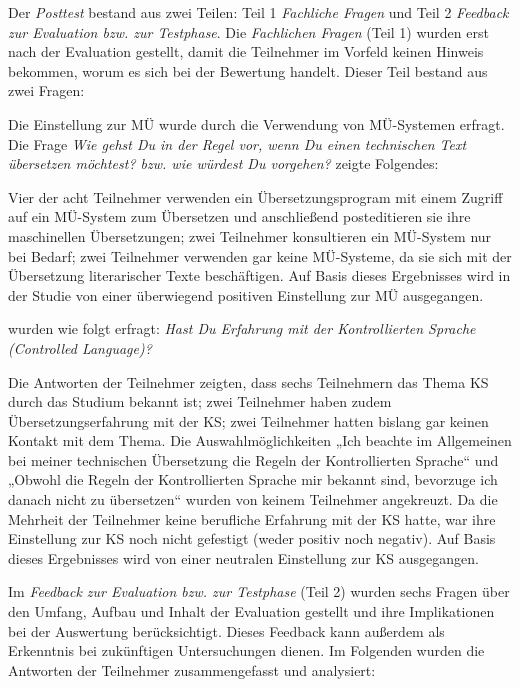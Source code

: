 Der \textit{Posttest} bestand aus zwei Teilen: Teil 1 \textit{Fachliche Fragen} und Teil 2 \textit{Feedback zur Evaluation bzw. zur Testphase}. Die \textit{Fachlichen Fragen} (Teil 1) wurden erst nach der Evaluation gestellt, damit die Teilnehmer im Vorfeld keinen Hinweis bekommen, worum es sich bei der Bewertung handelt. Dieser Teil bestand aus zwei Fragen:

\begin{description}[font = \normalfont\bfseries]
\item[1. Einstellung zur MÜ:] Die Einstellung zur MÜ wurde durch die Verwendung von MÜ-Systemen erfragt. Die Frage \textit{Wie gehst Du in der Regel vor, wenn Du einen technischen Text übersetzen möchtest? bzw. wie würdest Du vorgehen?} zeigte Folgendes:

Vier der acht Teilnehmer verwenden ein Übersetzungsprogram mit einem Zugriff auf ein MÜ-System zum Übersetzen und anschließend posteditieren sie ihre maschinellen Übersetzungen; zwei Teilnehmer konsultieren ein MÜ-System nur bei Bedarf; zwei Teilnehmer verwenden gar keine MÜ-Systeme, da sie sich mit der Übersetzung literarischer Texte beschäftigen. Auf Basis dieses Ergebnisses wird in der Studie von einer überwiegend positiven Einstellung zur MÜ ausgegangen.

\newpage
\largerpage[3]
\item[2. Kenntnisse bzw. Erfahrung mit der Kontrollierten Sprache] wurden wie folgt erfragt: \textit{Hast Du Erfahrung mit der Kontrollierten Sprache (Controlled Language)?}

Die Antworten der Teilnehmer zeigten, dass sechs Teilnehmern das Thema KS durch das Studium bekannt ist; zwei Teilnehmer haben zudem Übersetzungserfahrung mit der KS; zwei Teilnehmer hatten bislang gar keinen Kontakt mit dem Thema. Die Auswahlmöglichkeiten „Ich beachte im Allgemeinen bei meiner technischen Übersetzung die Regeln der Kontrollierten Sprache“ und „Obwohl die Regeln der Kontrollierten Sprache mir bekannt sind, bevorzuge ich danach nicht zu übersetzen“ wurden von keinem Teilnehmer angekreuzt. Da die Mehrheit der Teilnehmer keine berufliche Erfahrung mit der KS hatte, war ihre Einstellung zur KS noch nicht gefestigt (weder positiv noch negativ). Auf Basis dieses Ergebnisses wird von einer neutralen Einstellung zur KS ausgegangen.
\end{description}\clearpage

Im \textit{Feedback zur Evaluation bzw. zur Testphase} (Teil 2) wurden sechs Fragen über den Umfang, Aufbau und Inhalt der Evaluation gestellt und ihre Implikationen bei der Auswertung berücksichtigt. Dieses Feedback kann außerdem als Erkenntnis bei zukünftigen Untersuchungen dienen. %
Im Folgenden wurden die Antworten der Teilnehmer zusammengefasst und analysiert:

